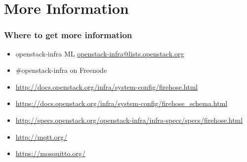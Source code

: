 \documentclass[aspectratio=169,11pt,hyperref={colorlinks=true}]{beamer}
\begin{document}
\section{More Information}
\begin{frame}
\frametitle{Where to get more information}
    \begin{itemize}
        \item openstack-infra ML\: \href{mailto:openstack-infra@lists.openstack.org}{openstack-infra@lists.openstack.org}
        \item \#openstack-infra on Freenode
	\item \href{http://docs.openstack.org/infra/system-config/firehose.html}{http://docs.openstack.org/infra/system-config/firehose.html}
    \item \href{https://docs.openstack.org/infra/system-config/firehose_schema.html}{https://docs.openstack.org/infra/system-config/firehose\_schema.html}
	\item \href{http://specs.openstack.org/openstack-infra/infra-specs/specs/firehose.html}{http://specs.openstack.org/openstack-infra/infra-specs/specs/firehose.html}
	\item \href{http://mqtt.org/}{http://mqtt.org/}
	\item \href{https://mosquitto.org/}{https://mosquitto.org/}
    \end{itemize}
\end{frame}
\end{document}
